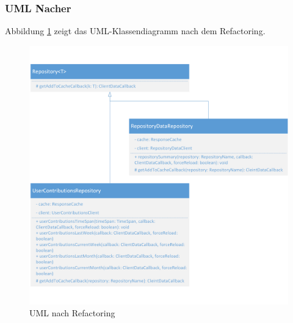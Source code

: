 \documentclass[12pt]{article}
\begin{document}
\newpage
\subsubsection{UML Nacher}
Abbildung \ref{fig:ExtractMethod_Refactoring_After} zeigt das UML-Klassendiagramm nach dem Refactoring.
\begin{figure}[h]
  \includegraphics{refactoring_extract_method_repository_after.png}
  \caption{UML nach Refactoring}
  \label{fig:ExtractMethod_Refactoring_After}
\end{figure}
\end{document}
